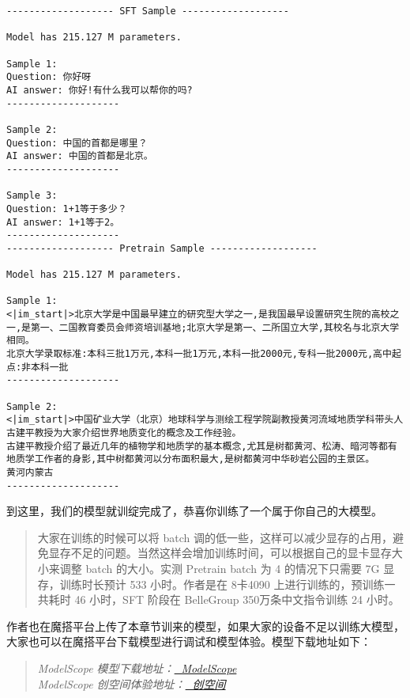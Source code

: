 \documentclass[12pt,a4paper]{book}
\begin{document}
\begin{verbatim}
------------------- SFT Sample ------------------- 

Model has 215.127 M parameters.

Sample 1:
Question: 你好呀 
AI answer: 你好!有什么我可以帮你的吗?
--------------------

Sample 2:
Question: 中国的首都是哪里？ 
AI answer: 中国的首都是北京。
--------------------

Sample 3:
Question: 1+1等于多少？ 
AI answer: 1+1等于2。
--------------------
------------------- Pretrain Sample ------------------- 

Model has 215.127 M parameters.

Sample 1:
<|im_start|>北京大学是中国最早建立的研究型大学之一,是我国最早设置研究生院的高校之一,是第一、二国教育委员会师资培训基地;北京大学是第一、二所国立大学,其校名与北京大学相同。
北京大学录取标准:本科三批1万元,本科一批1万元,本科一批2000元,专科一批2000元,高中起点:非本科一批
--------------------

Sample 2:
<|im_start|>中国矿业大学（北京）地球科学与测绘工程学院副教授黄河流域地质学科带头人古建平教授为大家介绍世界地质变化的概念及工作经验。
古建平教授介绍了最近几年的植物学和地质学的基本概念,尤其是树都黄河、松涛、暗河等都有地质学工作者的身影,其中树都黄河以分布面积最大,是树都黄河中华砂岩公园的主景区。
黄河内蒙古
--------------------
\end{verbatim}

到这里，我们的模型就训绽完成了，恭喜你训练了一个属于你自己的大模型。

\begin{quote}
大家在训练的时候可以将 batch
调的低一些，这样可以减少显存的占用，避免显存不足的问题。当然这样会增加训练时间，可以根据自己的显卡显存大小来调整
batch 的大小。实测 Pretrain batch 为 4 的情况下只需要 7G
显存，训练时长预计 533 小时。作者是在 8卡4090
上进行训练的，预训练一共耗时 46 小时，SFT 阶段在 BelleGroup
350万条中文指令训练 24 小时。
\end{quote}

作者也在魔搭平台上传了本章节训来的模型，如果大家的设备不足以训练大模型，大家也可以在魔搭平台下载模型进行调试和模型体验。模型下载地址如下：

\begin{quote}
\emph{ModelScope
模型下载地址：\href{https://www.modelscope.cn/collections/Happy-LLM-e98b91b10b684a}{🤖
ModelScope}}\\
\emph{ModelScope
创空间体验地址：\href{https://www.modelscope.cn/studios/kmno4zx/happy_llm_215M_sft}{🤖
创空间}}
\end{quote}
\end{document}

